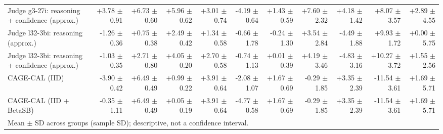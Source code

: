 \begin{tabular}{lrrrrrrrrrr}
Judge g3-27i: reasoning + confidence (approx.) & +3.78 {\scriptsize $\pm$ 0.91} & +6.73 {\scriptsize $\pm$ 0.60} & +5.96 {\scriptsize $\pm$ 0.62} & +3.01 {\scriptsize $\pm$ 0.74} & -4.19 {\scriptsize $\pm$ 0.64} & +1.43 {\scriptsize $\pm$ 0.59} & +7.60 {\scriptsize $\pm$ 2.32} & +4.18 {\scriptsize $\pm$ 1.42} & +8.07 {\scriptsize $\pm$ 3.57} & +2.89 {\scriptsize $\pm$ 4.55} \\
Judge l32-3bi: reasoning (approx.) & -1.26 {\scriptsize $\pm$ 0.36} & +0.75 {\scriptsize $\pm$ 0.38} & +2.49 {\scriptsize $\pm$ 0.42} & +1.34 {\scriptsize $\pm$ 0.58} & -0.66 {\scriptsize $\pm$ 1.78} & -0.24 {\scriptsize $\pm$ 1.30} & +3.54 {\scriptsize $\pm$ 2.84} & -4.49 {\scriptsize $\pm$ 1.88} & +9.93 {\scriptsize $\pm$ 1.72} & +0.00 {\scriptsize $\pm$ 5.75} \\
Judge l32-3bi: reasoning + confidence (approx.) & -1.03 {\scriptsize $\pm$ 0.35} & +2.71 {\scriptsize $\pm$ 0.80} & +4.05 {\scriptsize $\pm$ 0.20} & +2.70 {\scriptsize $\pm$ 0.58} & -0.74 {\scriptsize $\pm$ 1.13} & +0.01 {\scriptsize $\pm$ 0.39} & +4.19 {\scriptsize $\pm$ 3.46} & -4.83 {\scriptsize $\pm$ 3.16} & +10.27 {\scriptsize $\pm$ 3.72} & +1.55 {\scriptsize $\pm$ 2.56} \\
CAGE-CAL (IID) & -3.90 {\scriptsize $\pm$ 0.42} & +6.49 {\scriptsize $\pm$ 0.49} & +0.99 {\scriptsize $\pm$ 0.22} & +3.91 {\scriptsize $\pm$ 0.64} & -2.08 {\scriptsize $\pm$ 1.07} & +1.67 {\scriptsize $\pm$ 0.69} & -0.29 {\scriptsize $\pm$ 1.85} & +3.35 {\scriptsize $\pm$ 2.39} & -11.54 {\scriptsize $\pm$ 3.61} & +1.69 {\scriptsize $\pm$ 5.71} \\
CAGE-CAL (IID + BetaSB) & -0.35 {\scriptsize $\pm$ 1.11} & +6.49 {\scriptsize $\pm$ 0.49} & +0.05 {\scriptsize $\pm$ 0.19} & +3.91 {\scriptsize $\pm$ 0.64} & -4.77 {\scriptsize $\pm$ 0.58} & +1.67 {\scriptsize $\pm$ 0.69} & -0.29 {\scriptsize $\pm$ 1.85} & +3.35 {\scriptsize $\pm$ 2.39} & -11.54 {\scriptsize $\pm$ 3.61} & +1.69 {\scriptsize $\pm$ 5.71} \\
\bottomrule
\multicolumn{11}{l}{\scriptsize Mean $\pm$ SD across groups (sample SD); descriptive, not a confidence interval.} \\
\end{tabular}

